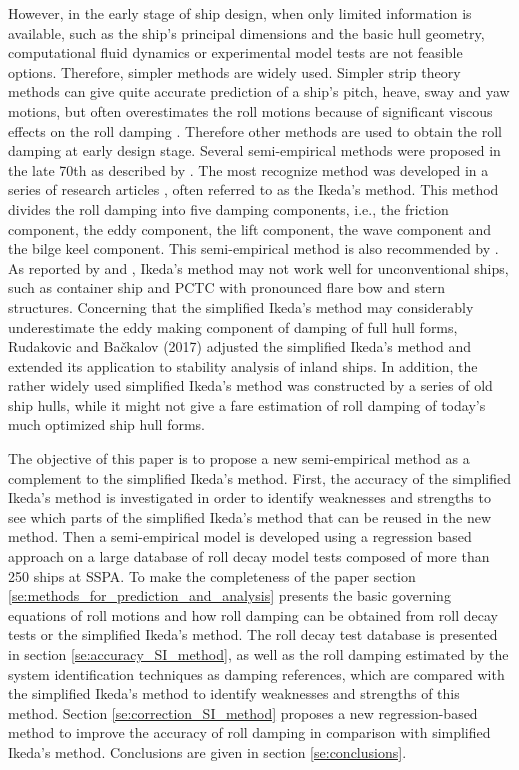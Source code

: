 However, in the early stage of ship design, when only limited information is available, such as the ship's principal dimensions and the basic hull geometry, computational fluid dynamics or experimental model tests are not feasible options.
Therefore, simpler methods are widely used. Simpler strip theory methods can give quite accurate prediction of a ship's pitch, heave, sway and yaw motions, but often overestimates the roll motions because of significant viscous effects on the roll damping \parencite{kawahara_simple_2011}. Therefore other methods are used to obtain the roll damping at early design stage. Several semi-empirical methods were proposed in the late 70th as described by  \parencite{himeno_prediction_1981}. The most recognize method was developed in a series of research articles \parencite{ikeda_roll_1978,ikeda_eddy_1978,ikeda_roll_1979,ikeda_components_1978,ikeda_velocity_1979}, often referred to as the Ikeda's method. This method divides the roll damping into five damping components, i.e., the friction component, the eddy component, the lift component, the wave component and the bilge keel component. This semi-empirical method is also recommended by \parencite{ittc_ittc_2011}. As reported by  \parencite{kawahara_simple_2011} and \parencite{soder_ikeda_2019}, Ikeda's method may not work well for unconventional ships, such as container ship and PCTC with pronounced flare bow and stern structures. Concerning that the simplified Ikeda’s
method may considerably underestimate the eddy making component
of damping of full hull forms, Rudakovic and Bačkalov (2017) adjusted the simplified Ikeda’s method and  extended its application to stability analysis of inland ships.
In addition, the rather widely used simplified Ikeda's method \parencite{kawahara_simple_2011} was constructed by a series of old ship hulls, while it might not give a fare estimation of roll damping of today's much optimized ship hull forms. 

The objective of this paper is to propose a new semi-empirical method as a complement to the simplified Ikeda's method. First, the accuracy of the simplified Ikeda's method is investigated in order to identify weaknesses and strengths to see which parts of the simplified Ikeda's method that can be reused in the new method.  
Then a semi-empirical model is developed using a regression based approach on a large database of roll decay model tests composed of more than 250 ships at SSPA.
To make the completeness of the paper section \ref{se:methods_for_prediction_and_analysis} presents the basic governing equations of roll motions and how roll damping can be obtained from roll decay tests or the simplified Ikeda's method. 
The roll decay test database is presented in section \ref{se:accuracy_SI_method}, as well as the roll damping estimated by the system identification techniques as damping references, which are compared with the simplified Ikeda's method to identify weaknesses and strengths of this method. Section \ref{se:correction_SI_method} proposes a new regression-based method to improve the accuracy of roll damping in comparison with simplified Ikeda's method. Conclusions are given in section \ref{se:conclusions}.  
